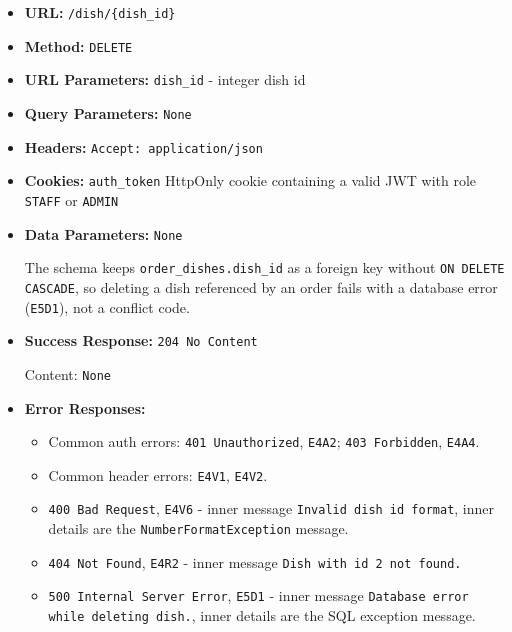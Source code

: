 \begin{itemize}[nosep]
\item \textbf{URL:} \texttt{/dish/\{dish\_id\}}

\item \textbf{Method:} \texttt{DELETE}

\item \textbf{URL Parameters:} \texttt{dish\_id} - integer dish id

\item \textbf{Query Parameters:} \texttt{None}

\item \textbf{Headers:} \texttt{Accept: application/json}

\item \textbf{Cookies:} \texttt{auth\_token} HttpOnly cookie containing a valid JWT with role \texttt{STAFF} or \texttt{ADMIN}

\item \textbf{Data Parameters:} \texttt{None}

The schema keeps \texttt{order\_dishes.dish\_id} as a foreign key without \texttt{ON DELETE CASCADE}, so deleting a dish referenced by an order fails with a database error (\texttt{E5D1}), not a conflict code.

\item \textbf{Success Response:} \texttt{204 No Content}

Content: \texttt{None}

\item \textbf{Error Responses:}

\begin{itemize}[nosep]
\item Common auth errors: \texttt{401 Unauthorized}, \texttt{E4A2}; \texttt{403 Forbidden}, \texttt{E4A4}.
\item Common header errors: \texttt{E4V1}, \texttt{E4V2}.
\item \texttt{400 Bad Request}, \texttt{E4V6} - inner message \texttt{Invalid dish id format}, inner details are the \texttt{NumberFormatException} message.
\item \texttt{404 Not Found}, \texttt{E4R2} - inner message \texttt{Dish with id 2 not found.}
\item \texttt{500 Internal Server Error}, \texttt{E5D1} - inner message \texttt{Database error while deleting dish.}, inner details are the SQL exception message.
\end{itemize}

\end{itemize}

